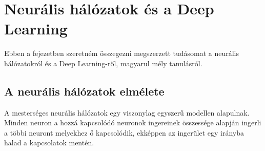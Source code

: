 \chapter{Neurális hálózatok és a Deep Learning}
Ebben a fejezetben szeretném összegezni megszerzett tudásomat a neurális hálózatokról és a Deep Learning-ről, magyarul mély tanulásról. 
\section{A neurális hálózatok elmélete}
\label{section:neuralNetworkTheory}

A mesterséges neurális hálózatok egy viszonylag egyszerű modellen alapulnak. Minden neuron a hozzá kapcsolódó neuronok ingereinek összessége alapján ingerli a többi neuront melyekhez ő kapcsolódik, ekképpen az ingerület egy irányba halad a kapcsolatok mentén.

